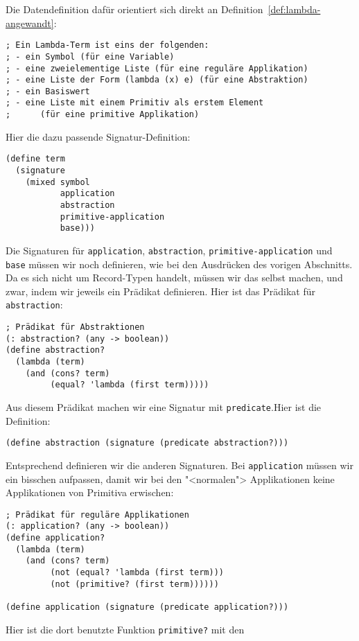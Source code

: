 Die Datendefinition dafür orientiert sich direkt an
Definition~\ref{def:lambda-angewandt}:
%
\begin{lstlisting}
; Ein Lambda-Term ist eins der folgenden:
; - ein Symbol (für eine Variable)
; - eine zweielementige Liste (für eine reguläre Applikation)
; - eine Liste der Form (lambda (x) e) (für eine Abstraktion)
; - ein Basiswert
; - eine Liste mit einem Primitiv als erstem Element
;      (für eine primitive Applikation)
\end{lstlisting}
%
Hier die dazu passende Signatur-Definition:
%
\begin{lstlisting}
(define term
  (signature
    (mixed symbol
           application
           abstraction
           primitive-application
           base)))
\end{lstlisting}
%
Die Signaturen für \lstinline{application}, \lstinline{abstraction},
\lstinline{primitive-application} und \lstinline{base} müssen wir noch
definieren, wie bei den Ausdrücken des vorigen Abschnitts.
Da es sich nicht um Record-Typen handelt, müssen wir das
selbst machen, und zwar, indem wir jeweils ein Prädikat definieren.
Hier ist das Prädikat für \lstinline{abstraction}:
%
\begin{lstlisting}
; Prädikat für Abstraktionen
(: abstraction? (any -> boolean))
(define abstraction?
  (lambda (term)
    (and (cons? term)
         (equal? 'lambda (first term)))))
\end{lstlisting}
%
Aus diesem Prädikat machen wir eine Signatur mit
\lstinline{predicate}.Hier ist die Definition:
%
\begin{lstlisting}
(define abstraction (signature (predicate abstraction?)))
\end{lstlisting}
%
%
Entsprechend definieren wir die anderen Signaturen.  Bei
\lstinline{application} müssen wir ein bisschen aufpassen, damit wir
bei den "<normalen"> Applikationen keine Applikationen von Primitiva
erwischen:
%
\begin{lstlisting}
; Prädikat für reguläre Applikationen
(: application? (any -> boolean))
(define application?
  (lambda (term)
    (and (cons? term)
         (not (equal? 'lambda (first term)))
         (not (primitive? (first term))))))

(define application (signature (predicate application?)))
\end{lstlisting}
%
Hier ist die dort benutzte Funktion \lstinline{primitive?} mit den
